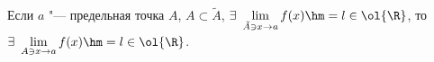 \label{mpod}
        Если $a$ "--- предельная точка $A$, $A\subset \tilde A$, $\exists\ \lim\limits_{\tilde A\ni x\to a}f(x)\hm=l\in\ol{\R}$, то $\exists\ 
        \lim\limits_{A\ni x\to a}f(x)\hm=l\in\ol{\R}$.
    